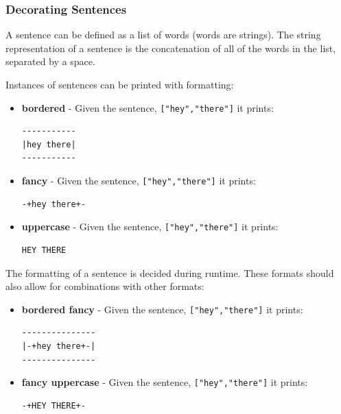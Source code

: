\subsubsection{Decorating
Sentences}\label{structural-patterns.md__decorating-sentences}

A sentence can be defined as a list of words (words are strings). The
string representation of a sentence is the concatenation of all of the
words in the list, separated by a space.

Instances of sentences can be printed with formatting:

\begin{itemize}
\item
  \textbf{bordered} - Given the sentence, \texttt{{[}"hey","there"{]}}
  it prints:

\begin{verbatim}
-----------
|hey there|
-----------
\end{verbatim}
\item
  \textbf{fancy} - Given the sentence, \texttt{{[}"hey","there"{]}} it
  prints:

\begin{verbatim}
-+hey there+-
\end{verbatim}
\item
  \textbf{uppercase} - Given the sentence, \texttt{{[}"hey","there"{]}}
  it prints:

\begin{verbatim}
HEY THERE
\end{verbatim}
\end{itemize}

The formatting of a sentence is decided during runtime. These formats
should also allow for combinations with other formats:

\begin{itemize}
\item
  \textbf{bordered fancy} - Given the sentence,
  \texttt{{[}"hey","there"{]}} it prints:

\begin{verbatim}
---------------
|-+hey there+-|
---------------
\end{verbatim}
\item
  \textbf{fancy uppercase} - Given the sentence,
  \texttt{{[}"hey","there"{]}} it prints:

\begin{verbatim}
-+HEY THERE+-
\end{verbatim}
\end{itemize}

